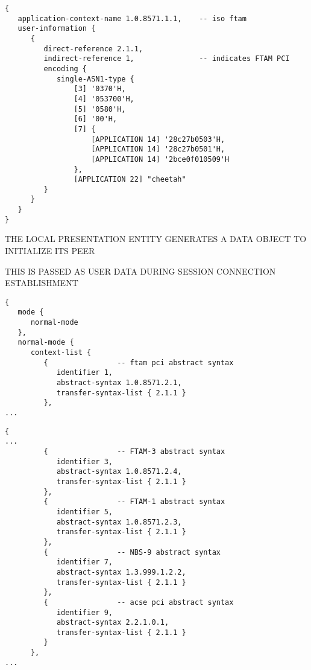 \begin{bwslide}

\smaller
\begin{verbatim}
{
   application-context-name 1.0.8571.1.1,    -- iso ftam
   user-information {
      {
         direct-reference 2.1.1,
         indirect-reference 1,               -- indicates FTAM PCI
         encoding {
            single-ASN1-type {
                [3] '0370'H,
                [4] '053700'H,
                [5] '0580'H,
                [6] '00'H,
                [7] {
                    [APPLICATION 14] '28c27b0503'H,
                    [APPLICATION 14] '28c27b0501'H,
                    [APPLICATION 14] '2bce0f010509'H
                },
                [APPLICATION 22] "cheetah"
         }
      }
   }
}
\end{verbatim}
\end{bwslide}


\begin{bwslide}

\begin{nrtc}
\item	THE LOCAL PRESENTATION ENTITY GENERATES A DATA OBJECT TO INITIALIZE
	ITS PEER

\item	THIS IS PASSED AS USER DATA DURING SESSION CONNECTION ESTABLISHMENT 
\end{nrtc}
\end{bwslide}


\begin{bwslide}

\scriptsize
\begin{verbatim}
{
   mode {
      normal-mode
   },
   normal-mode {
      context-list {
         {                -- ftam pci abstract syntax
            identifier 1,
            abstract-syntax 1.0.8571.2.1,
            transfer-syntax-list { 2.1.1 }
         },
...
\end{verbatim}
\end{bwslide}


\begin{bwslide}

\scriptsize
\begin{verbatim}
{
...
         {                -- FTAM-3 abstract syntax
            identifier 3,
            abstract-syntax 1.0.8571.2.4,
            transfer-syntax-list { 2.1.1 }
         },
         {                -- FTAM-1 abstract syntax
            identifier 5,
            abstract-syntax 1.0.8571.2.3,
            transfer-syntax-list { 2.1.1 }
         },
         {                -- NBS-9 abstract syntax
            identifier 7,
            abstract-syntax 1.3.999.1.2.2,
            transfer-syntax-list { 2.1.1 }
         },
         {                -- acse pci abstract syntax
            identifier 9,
            abstract-syntax 2.2.1.0.1,
            transfer-syntax-list { 2.1.1 }
         }
      },
...
\end{verbatim}
\end{bwslide}


